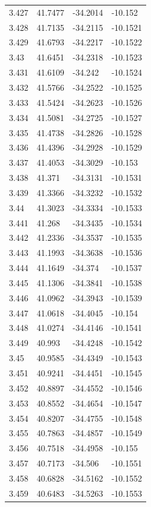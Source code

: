 \begin{tabular}{llll}
3.427 & 41.7477 & -34.2014 & -10.152 \\
3.428 & 41.7135 & -34.2115 & -10.1521 \\
3.429 & 41.6793 & -34.2217 & -10.1522 \\
3.43 & 41.6451 & -34.2318 & -10.1523 \\
3.431 & 41.6109 & -34.242 & -10.1524 \\
3.432 & 41.5766 & -34.2522 & -10.1525 \\
3.433 & 41.5424 & -34.2623 & -10.1526 \\
3.434 & 41.5081 & -34.2725 & -10.1527 \\
3.435 & 41.4738 & -34.2826 & -10.1528 \\
3.436 & 41.4396 & -34.2928 & -10.1529 \\
3.437 & 41.4053 & -34.3029 & -10.153 \\
3.438 & 41.371 & -34.3131 & -10.1531 \\
3.439 & 41.3366 & -34.3232 & -10.1532 \\
3.44 & 41.3023 & -34.3334 & -10.1533 \\
3.441 & 41.268 & -34.3435 & -10.1534 \\
3.442 & 41.2336 & -34.3537 & -10.1535 \\
3.443 & 41.1993 & -34.3638 & -10.1536 \\
3.444 & 41.1649 & -34.374 & -10.1537 \\
3.445 & 41.1306 & -34.3841 & -10.1538 \\
3.446 & 41.0962 & -34.3943 & -10.1539 \\
3.447 & 41.0618 & -34.4045 & -10.154 \\
3.448 & 41.0274 & -34.4146 & -10.1541 \\
3.449 & 40.993 & -34.4248 & -10.1542 \\
3.45 & 40.9585 & -34.4349 & -10.1543 \\
3.451 & 40.9241 & -34.4451 & -10.1545 \\
3.452 & 40.8897 & -34.4552 & -10.1546 \\
3.453 & 40.8552 & -34.4654 & -10.1547 \\
3.454 & 40.8207 & -34.4755 & -10.1548 \\
3.455 & 40.7863 & -34.4857 & -10.1549 \\
3.456 & 40.7518 & -34.4958 & -10.155 \\
3.457 & 40.7173 & -34.506 & -10.1551 \\
3.458 & 40.6828 & -34.5162 & -10.1552 \\
3.459 & 40.6483 & -34.5263 & -10.1553 \\

\end{tabular}
